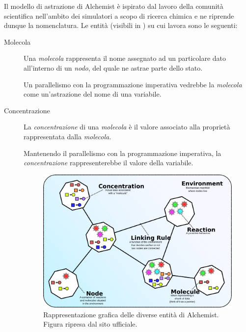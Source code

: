     Il modello di astrazione di Alchemist è ispirato dal lavoro della comunità scientifica nell'ambito dei simulatori a scopo di ricerca chimica e ne riprende dunque la nomenclatura.
    Le entità (visibili in ) su cui lavora sono le seguenti:

    \begin{description}
      \item[Molecola]\label{itm:mol}
        Una \emph{molecola} rappresenta il nome assegnato ad un particolare dato all'interno di un \emph{nodo}, del quale ne astrae parte dello stato.

        Un parallelismo con la programmazione imperativa vedrebbe la \emph{molecola} come un'astrazione del nome di una variabile.

      \item[Concentrazione]\label{itm:conc}
        La \emph{concentrazione} di una \emph{molecola} è il valore associato alla proprietà rappresentata dalla \emph{molecola}.

        Mantenendo il parallelismo con la programmazione imperativa, la \emph{concentrazione} rappresenterebbe il valore della variabile.

        \begin{figure}[tbp] %
          \centering
          \includegraphics[width=.85\textwidth]{res/fig/alchemist_model.png}
          \caption[%
            Rappresentazione grafica delle diverse entità di Alchemist.
          ]{%
            Rappresentazione grafica delle diverse entità di Alchemist.\\
            Figura ripresa dal sito ufficiale\protect\footnotemark.
          }%
          \label{fig:alchemist:model}
        \end{figure}


\end{description}
